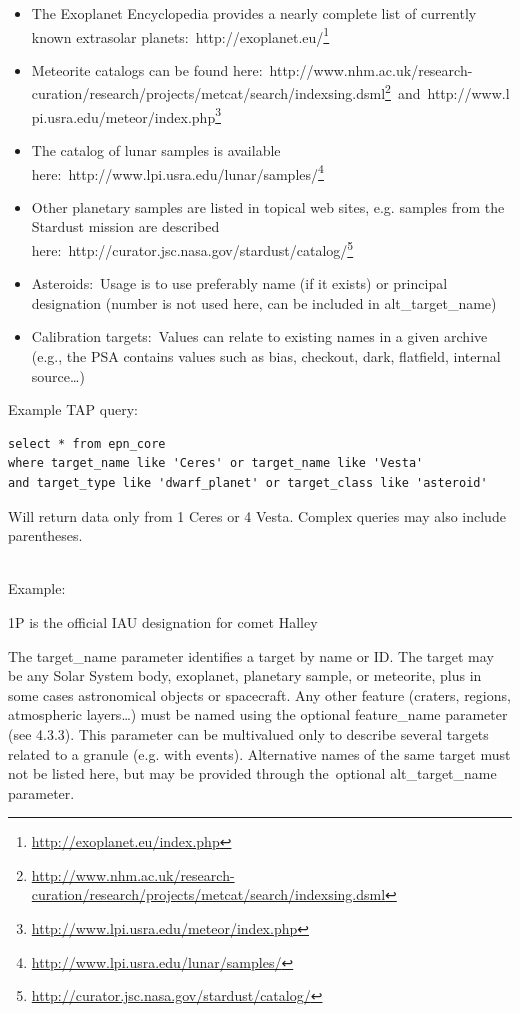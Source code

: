 \documentclass[11pt,a4paper]{ivoa}
\begin{document}
\begin{itemize}
\item The Exoplanet Encyclopedia provides a nearly complete list of currently known extrasolar planets: http://exoplanet.eu/\footnote{\url{http://exoplanet.eu/index.php}}
\item Meteorite catalogs can be found here: http://www.nhm.ac.uk/research-curation/research/projects/metcat/search/indexsing.dsml\footnote{\url{http://www.nhm.ac.uk/research-curation/research/projects/metcat/search/indexsing.dsml}} and http://www.lpi.usra.edu/meteor/index.php\footnote{\url{http://www.lpi.usra.edu/meteor/index.php}}
\item The catalog of lunar samples is available here: http://www.lpi.usra.edu/lunar/samples/\footnote{\url{http://www.lpi.usra.edu/lunar/samples/}}
\item Other planetary samples are listed in topical web sites, e.g. samples from the Stardust mission are described here: http://curator.jsc.nasa.gov/stardust/catalog/\footnote{\url{http://curator.jsc.nasa.gov/stardust/catalog/}}
\item Asteroids: Usage is to use preferably name (if it exists) or principal designation (number is not used here, can be included in alt\_target\_name)
\item Calibration targets: Values can relate to existing names in a given archive (e.g., the PSA contains values such as bias, checkout, dark, flatfield, internal source…)
\end{itemize}

Example TAP query:






\begin{verbatim}
select * from epn_core 
where target_name like 'Ceres' or target_name like 'Vesta' 
and target_type like 'dwarf_planet' or target_class like 'asteroid'
\end{verbatim}




Will return data only from 1 Ceres or 4 Vesta. Complex queries may also include parentheses.

\\

Example:

1P is the official IAU designation for comet Halley

The target\_name parameter identifies a target by name or ID. The target may be any Solar System body, exoplanet, planetary sample, or meteorite, plus in some cases astronomical objects or spacecraft. Any other feature (craters, regions, atmospheric layers…) must be named using the optional feature\_name parameter (see 4.3.3). This parameter can be multivalued only to describe several targets related to a granule (e.g. with events). Alternative names of the same target must not be listed here, but may be provided through the optional alt\_target\_name parameter. 
\end{document}

